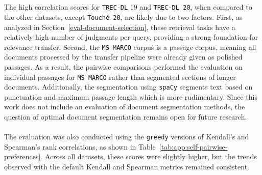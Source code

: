 \\\\
The high correlation scores for \texttt{TREC-DL} 19 and \texttt{TREC-DL 20}, when compared to the other datasets, except \texttt{Touché 20}, are likely due to two factors. First, as analyzed in Section~\ref{eval-document-selection}, these retrieval tasks have a relatively high number of judgments per query, providing a strong foundation for relevance transfer. Second, the \texttt{MS MARCO} corpus is a passage corpus, meaning all documents processed by the transfer pipeline were already given as polished passages. As a result, the pairwise comparisons performed the evaluation on individual passages for \texttt{MS MARCO} rather than segmented sections of longer documents. Additionally, the segmentation using \texttt{spaCy}  segments text based on punctuation and maximum passage length which is more rudimentary. Since this work does not include an evaluation of document segmentation methods, the question of optimal document segmentation remains open for future research.
\\\\
The evaluation was also conducted using the \texttt{greedy} versions of Kendall's and Spearman's rank correlations, as shown in Table~\ref{tab:app:self-pairwise-preferences}. Across all datasets, these scores were slightly higher, but the trends observed with the default Kendall and Spearman metrics remained consistent.
\pagebreak
